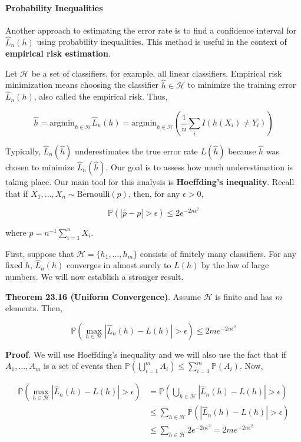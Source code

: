 \paragraph{Probability Inequalities}\label{probability:inequalities}

Another approach to estimating the error rate is to find a confidence
interval for \(\hat{L}_{n}(h)\) using probability inequalities. This
method is useful in the context of \textbf{empirical risk estimation}.

Let \(\mathcal{H}\) be a set of classifiers, for example, all linear
classifiers. Empirical risk minimization means choosing the classifier
\(\hat{h} \in \mathcal{H}\) to minimize the training error
\(\hat{L}_{n}(h)\), also called the empirical risk. Thus,

\[ \hat{h} = \text{argmin}_{h \in \mathcal{H}} \hat{L}_{n}(h) 
= \text{argmin}_{h \in \mathcal{H}} \left( \frac{1}{n} \sum_{i} I(h(X_{i}) \neq Y_{i}) \right) \]

Typically, \(\hat{L}_{n}(\hat{h})\) underestimates the true error rate
\(L(\hat{h})\) because \(\hat{h}\) was chosen to minimize
\(\hat{L}_{n}(\hat{h})\). Our goal is to assess how much underestimation
is taking place. Our main tool for this analysis is \textbf{Hoeffding's
inequality}. Recall that if
\(X_{1}, \dots, X_{n} \sim \text{Bernoulli}(p)\), then, for any
\(\epsilon > 0\),

\[ \mathbb{P}(|\hat{p} - p| > \epsilon) \leq 2 e^{ -2 n \epsilon^{2} } \]

where \(\hat{p} = n^{-1} \sum_{i=1}^{n} X_{i}\).

First, suppose that \(\mathcal{H} = \{ h_{1}, \dots, h_m \}\) consists of
finitely many classifiers. For any fixed \(h\), \(\hat{L}_{n}(h)\)
converges in almost surely to \(L(h)\) by the law of large numbers. We
will now establish a stronger result.

\textbf{Theorem 23.16 (Uniform Convergence)}. Assume \(\mathcal{H}\) is
finite and has \(m\) elements. Then,

\[ \mathbb{P} \left( \max_{h \in \mathcal{H}} |\hat{L}_{n}(h) - L(h) | > \epsilon \right) \leq 2 m e^{-2 n \epsilon^{2}} \]

\textbf{Proof}. We will use Hoeffding's inequality and we will also use
the fact that if \(A_{1}, \dots, A_m\) is a set of events then
\(\mathbb{P}(\bigcup_{i=1}^m A_{i}) \leq \sum_{i=1}^m \mathbb{P}(A_{i})\).
Now,

\begin{align*}
\mathbb{P} \left( \max_{h \in \mathcal{H}} |\hat{L}_{n}(h) - L(h) | > \epsilon \right)
&= \mathbb{P} \left( \bigcup_{h \in \mathcal{H}} |\hat{L}_{n}(h) - L(h) | > \epsilon \right) \\
& \leq \sum_{h \in \mathcal{H}} \mathbb{P} \left( |\hat{L}_{n}(h) - L(h) | > \epsilon \right) \\
& \leq \sum_{h \in \mathcal{H}} 2 e^{-2 n \epsilon^{2}} = 2 m e^{-2 n \epsilon^{2}}
\end{align*}

